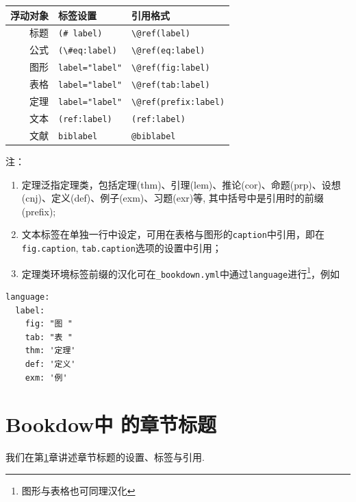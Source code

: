 \documentclass[12pt,]{krantz}
\theoremstyle{plain}
\theoremstyle{nonumberplain}
\begin{document}
\begin{longtable}[]{@{}rll@{}}
\toprule
浮动对象 & 标签设置 & 引用格式 \\
\midrule
\endhead
标题 & \texttt{(\#\ label)} & \texttt{\textbackslash{}@ref(label)} \\
公式 & \texttt{(\textbackslash{}\#eq:label)} & \texttt{\textbackslash{}@ref(eq:label)} \\
图形 & \texttt{label="label"} & \texttt{\textbackslash{}@ref(fig:label)} \\
表格 & \texttt{label="label"} & \texttt{\textbackslash{}@ref(tab:label)} \\
定理 & \texttt{label="label"} & \texttt{\textbackslash{}@ref(prefix:label)} \\
文本 & \texttt{(ref:label)} & \texttt{\textasciigrave{}(ref:label)\textasciigrave{}} \\
文献 & \texttt{biblabel} & \texttt{@biblabel} \\
\bottomrule
\end{longtable}

注：

\begin{enumerate}
\def\labelenumi{\arabic{enumi}.}
\item
  定理泛指定理类，包括定理(thm)、引理(lem)、推论(cor)、命题(prp)、设想(cnj)、定义(def)、例子(exm)、习题(exr)等, 其中括号中是引用时的前缀(prefix);
\item
  文本标签在单独一行中设定，可用在表格与图形的\texttt{caption}中引用，即在 \texttt{fig.caption}, \texttt{tab.caption}选项的设置中引用；
\item
  定理类环境标签前缀的汉化可在\texttt{\_bookdown.yml}中通过\texttt{language}进行\footnote{图形与表格也可同理汉化}，例如
\end{enumerate}

\begin{verbatim}
language:
  label:
    fig: "图 "
    tab: "表 "
    thm: '定理'
    def: '定义'
    exm: '例'
\end{verbatim}

\printbibliography[segment=\therefsegment, heading=subbibliography, title={参考文献}]

\hypertarget{sections}{%
\chapter{Bookdow中 的章节标题}\label{sections}}

\indent

我们在第\ref{sections}章讲述章节标题的设置、标签与引用. \autocite{xie2015,bookdown2016}
\end{document}
